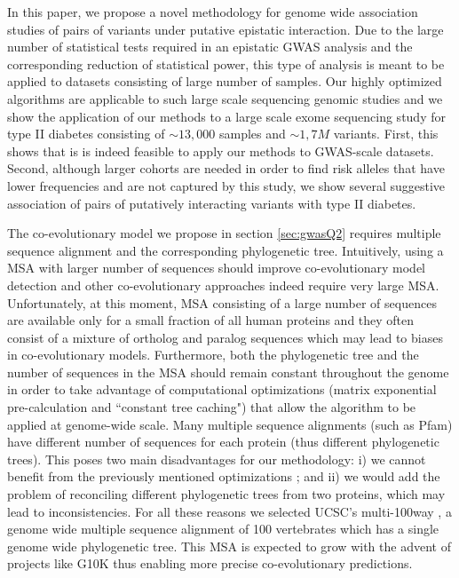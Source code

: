 In this paper, we propose a novel methodology for genome wide association studies of pairs of variants under putative epistatic interaction. 
Due to the large number of statistical tests required in an epistatic GWAS analysis and the corresponding reduction of statistical power, this type of analysis is meant to be applied to datasets consisting of large number of samples.
Our highly optimized algorithms are applicable to such large scale sequencing genomic studies and we show the application of our methods to a large scale exome sequencing study for type II diabetes consisting of $\sim 13,000$ samples and $\sim 1,7M$ variants. 
First, this shows that is is indeed feasible to apply our methods to GWAS-scale datasets. 
Second, although larger cohorts are needed in order to find risk alleles that have lower frequencies and are not captured by this study, we show several suggestive association of pairs of putatively interacting variants with type II diabetes. 

The co-evolutionary model we propose in section \ref{sec:gwasQ2} requires multiple sequence alignment and the corresponding phylogenetic tree.
Intuitively, using a MSA with larger number of sequences should improve co-evolutionary model detection and other co-evolutionary approaches indeed require very large MSA. 
Unfortunately, at this moment, MSA consisting of a large number of sequences are available only for a small fraction of all human proteins and they often consist of a mixture of ortholog and paralog sequences which may lead to biases in co-evolutionary models. 
Furthermore, both the phylogenetic tree and the number of sequences in the MSA should remain constant throughout the genome in order to take advantage of computational optimizations (matrix exponential pre-calculation and ``constant tree caching") that allow the algorithm to be applied at genome-wide scale. 
Many multiple sequence alignments (such as Pfam) have different number of sequences for each protein (thus different phylogenetic trees). This poses two main disadvantages for our methodology: 
i) we cannot benefit from the previously mentioned optimizations %
; and 
ii) we would add the problem of reconciling different phylogenetic trees from two proteins, which may lead to inconsistencies. 
For all these reasons we selected UCSC's multi-100way \cite{karolchik2014ucsc}, a genome wide multiple sequence alignment of 100 vertebrates which has a single genome wide phylogenetic tree. 
This MSA is expected to grow with the advent of projects like G10K \cite{haussler2009genome} thus enabling more precise co-evolutionary predictions. 

